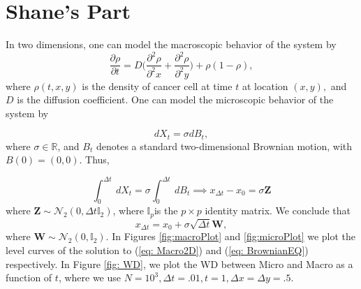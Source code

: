 \documentclass[10pt]{article}
\begin{document}
\section{Shane's Part}
In two dimensions, one can model the macroscopic behavior of the system by
\begin{equation}
\frac{\partial \rho}{\partial t} = D\Big(\frac{\partial^2 \rho}{\partial^2 x} + \frac{\partial^2 \rho}{\partial^2 y}\Big) + \rho(1-\rho),
\label{eq: Macro2D}
\end{equation}
where $\rho(t,x,y)$ is the density of cancer cell at time $t$ at location $(x,y),$ and $D$ is the diffusion coefficient. One can model the microscopic behavior of the system by 

\begin{equation}
dX_t = \sigma dB_t,
\label{eq: MicroModel2}
\end{equation}
where $\sigma \in \mathbb{R}$, and $B_t$ denotes a standard two-dimensional Brownian motion, with $B(0) = (0,0)$. Thus,

\begin{equation}
\int_0^{\Delta t} \ dX_t = \sigma \int_{0}^{\Delta t} \ dB_t \implies x_{\Delta t} - x_0 = \sigma \textbf{Z}
\end{equation}
where $\textbf{Z} \sim \mathcal{N}_2(0, \Delta t \mathbb{I}_2)$, where $\mathbb{I}_p$is the $p \times p$ identity matrix. We conclude that
\begin{equation}
x_{\Delta t} = x_0 + \sigma \sqrt{\Delta t}\textbf{W},
\label{eq: BrownianEQ}
\end{equation} 
where $\textbf{W} \sim \mathcal{N}_2(0, \mathbb{I}_2).$ In Figures \ref{fig:macroPlot} and \ref{fig:microPlot} we plot the level curves of the solution to (\ref{eq: Macro2D}) and (\ref{eq: BrownianEQ}) respectively. In Figure \ref{fig: WD}, we plot the WD between Micro and Macro as a function of $t$, where we use $N = 10^3, \Delta t = .01, t = 1, \Delta x = \Delta y = .5.$
\end{document}
